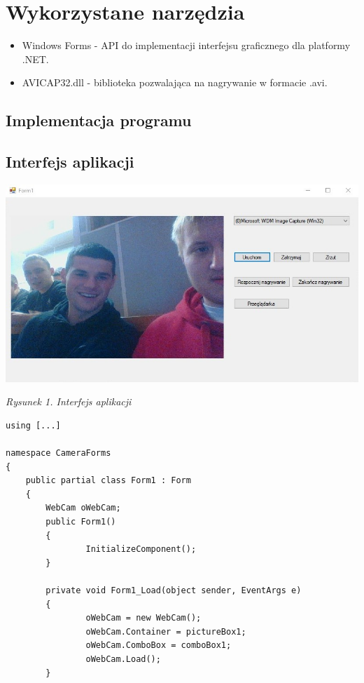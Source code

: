 \documentclass[12pt,a4paper,notitlepage]{report}
\begin{document}
\section{Wykorzystane narzędzia}
\begin{itemize}
\item Windows Forms - API do implementacji interfejsu graficznego dla platformy .NET.
\item AVICAP32.dll - biblioteka pozwalająca na nagrywanie w formacie .avi.
\end{itemize}
\begin{adjustwidth}{0pt}{-50pt}
\section{Implementacja programu}
\subsection{Interfejs aplikacji}
\noindent \includegraphics[scale=0.7]{okno}
\begin{center}
\begin{normalsize}
\textit{Rysunek 1. Interfejs aplikacji}
\end{normalsize}
\end{center}
\begin{lstlisting}
using [...]

namespace CameraForms
{
    public partial class Form1 : Form
    {
        WebCam oWebCam;
        public Form1()
        {
                InitializeComponent();
        }

        private void Form1_Load(object sender, EventArgs e)
        {
                oWebCam = new WebCam();
                oWebCam.Container = pictureBox1;
                oWebCam.ComboBox = comboBox1;
                oWebCam.Load();
        }



\end{lstlisting}
\end{adjustwidth}
\end{document}
